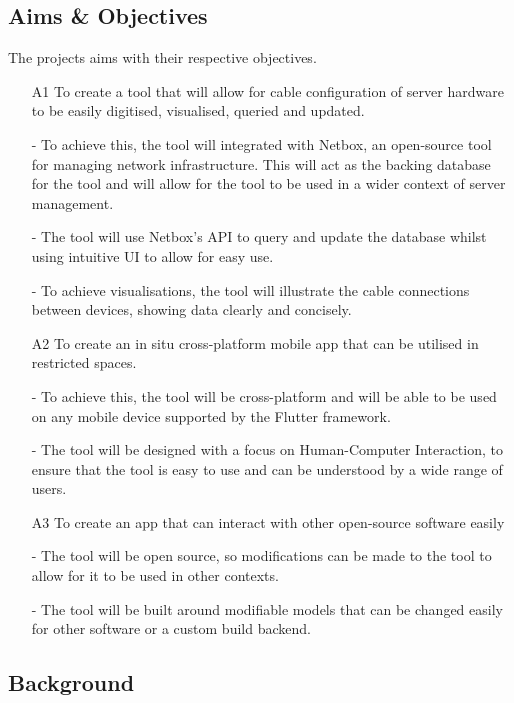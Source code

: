 \documentclass [11pt,a4paper]{article}
\begin{document}
\subsection{Aims \& Objectives}
\label{sec:objectives}
The projects aims with their respective objectives.
\begin{enumerate} 
    
    \item[A1] To create a tool that will allow for cable configuration of server hardware to be
    easily digitised, visualised, queried and updated. 
        
    - To achieve this, the tool will integrated with Netbox, an open-source tool for managing network infrastructure. This will act as the backing database for the tool and will allow for the tool to be used in a wider context of server management.

        - The tool will use Netbox's API to query and update the database whilst using intuitive UI to allow for easy use.
        
        - To achieve visualisations, the tool will illustrate the cable connections between devices, showing data clearly and concisely.

    \item[A2] To create an in situ cross-platform mobile app that can be utilised in restricted
    spaces.    

    - To achieve this, the tool will be cross-platform and will be able to be used on any mobile device supported by the Flutter framework.
    
    - The tool will be designed with a focus on Human-Computer Interaction, to ensure that the tool is easy to use and can be understood by a wide range of users.

    \item[A3] To create an app that can interact with other open-source software easily
    
        - The tool will be open source, so modifications can be made to the tool to allow for it to be used in other contexts.
        
        - The tool will be built around modifiable models that can be changed easily for other software or a custom build backend.

\end{enumerate}

\subsection{Background}
\label{sec:background}
\end{document}
